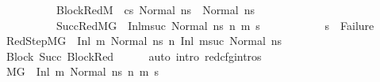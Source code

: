 \begin{isabellebody}
\ \ \ \ \ \ \ \ \ \ BlockRed{\isacharcolon}{\kern0pt}{\isachardoublequoteopen}M{\isacharcomma}{\kern0pt}{\isasymLambda}{\isacharcomma}{\kern0pt}{\isasymGamma}{\isacharcomma}{\kern0pt}{\isasymOmega}\ {\isasymturnstile}\ {\isasymlangle}cs{\isacharcomma}{\kern0pt}\ Normal\ ns{\isasymrangle}\ {\isacharbrackleft}{\kern0pt}{\isasymrightarrow}{\isacharbrackright}{\kern0pt}\ Normal\ ns{\isacharprime}{\kern0pt}{\isachardoublequoteclose}\ \isanewline
\ \ \ \ \ \ \ \ \ \ SuccRed{\isacharcolon}{\kern0pt}{\isachardoublequoteopen}M{\isacharcomma}{\kern0pt}{\isasymLambda}{\isacharcomma}{\kern0pt}{\isasymGamma}{\isacharcomma}{\kern0pt}{\isasymOmega}{\isacharcomma}{\kern0pt}G\ {\isasymturnstile}\ {\isacharparenleft}{\kern0pt}Inl{\isacharparenleft}{\kern0pt}msuc{\isacharparenright}{\kern0pt}{\isacharcomma}{\kern0pt}\ Normal\ ns{\isacharprime}{\kern0pt}{\isacharparenright}{\kern0pt}\ {\isacharminus}{\kern0pt}n{\isasymrightarrow}{\isacharasterisk}{\kern0pt}\ {\isacharparenleft}{\kern0pt}m{}{\isacharprime}{\kern0pt}{\isacharcomma}{\kern0pt}\ s{}{\isacharprime}{\kern0pt}{\isacharparenright}{\kern0pt}{\isachardoublequoteclose}\isanewline
\ \ \ \ \ \ \ \ \ \ \ {\isachardoublequoteopen}s{}{\isacharprime}{\kern0pt}\ {\isasymnoteq}\ Failure{\isachardoublequoteclose}\isanewline
%
\isadelimproof
%
\endisadelimproof
%
\isatagproof
{}\isamarkupfalse%
\ {\isacharminus}{\kern0pt}\isanewline
\ \ \isamarkupfalse%
\ RedStep{\isacharcolon}{\kern0pt}{\isachardoublequoteopen}M{\isacharcomma}{\kern0pt}{\isasymLambda}{\isacharcomma}{\kern0pt}{\isasymGamma}{\isacharcomma}{\kern0pt}{\isasymOmega}{\isacharcomma}{\kern0pt}G\ {\isasymturnstile}\ {\isacharparenleft}{\kern0pt}Inl\ m{\isacharcomma}{\kern0pt}\ Normal\ ns{\isacharparenright}{\kern0pt}\ {\isacharminus}{\kern0pt}n{\isasymrightarrow}\ {\isacharparenleft}{\kern0pt}Inl\ msuc{\isacharcomma}{\kern0pt}\ Normal\ ns{\isacharprime}{\kern0pt}{\isacharparenright}{\kern0pt}{\isachardoublequoteclose}\isanewline
\ \ \ \ \isamarkupfalse%
\ Block\ Succ\ BlockRed\isanewline
\ \ \ \ \isamarkupfalse%
\ {\isacharparenleft}{\kern0pt}auto\ intro{\isacharcolon}{\kern0pt}\ red{\isacharunderscore}{\kern0pt}cfg{\isachardot}{\kern0pt}intros{\isacharparenright}{\kern0pt}\isanewline
\ \ \isamarkupfalse%
\ {\isachardoublequoteopen}M{\isacharcomma}{\kern0pt}{\isasymLambda}{\isacharcomma}{\kern0pt}{\isasymGamma}{\isacharcomma}{\kern0pt}{\isasymOmega}{\isacharcomma}{\kern0pt}G\ {\isasymturnstile}\ {\isacharparenleft}{\kern0pt}Inl\ m{\isacharcomma}{\kern0pt}\ Normal\ ns{\isacharparenright}{\kern0pt}\ {\isacharminus}{\kern0pt}n{\isasymrightarrow}{\isacharasterisk}{\kern0pt}\ {\isacharparenleft}{\kern0pt}m{}{\isacharprime}{\kern0pt}{\isacharcomma}{\kern0pt}\ s{}{\isacharprime}{\kern0pt}{\isacharparenright}{\kern0pt}{\isachardoublequoteclose}\isanewline

\end{isabellebody}
